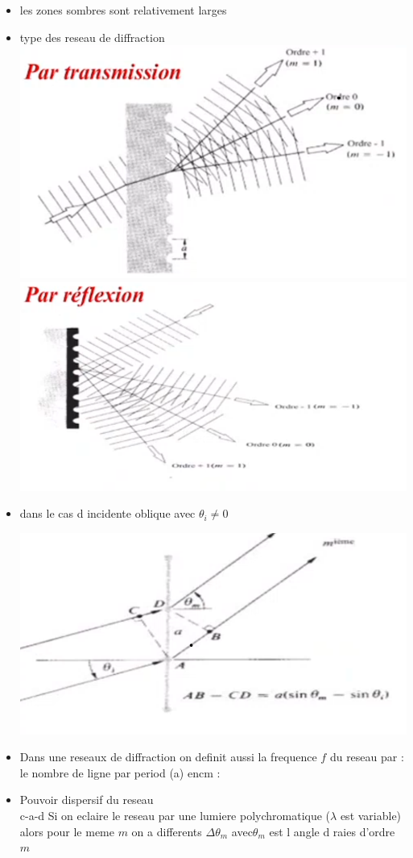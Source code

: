 \documentclass[12pt]{book}
\begin{document}
\begin{itemize}
                \item les zones sombres sont relativement larges 
                \item type des reseau de diffraction \\
                    \includegraphics[width=0.49\linewidth]{pic/reseaudediffractionpartransmission.png}
                    \includegraphics[width=0.49\linewidth]{pic/reseaudediffractionparreflexion.png}
                \item \begin{minipage}{0.49\linewidth}
                    dans le cas d incidente oblique  avec $\theta_i \not = 0$
                \end{minipage}
                \begin{minipage}{0.49\linewidth}
                    \includegraphics[width=0.49\linewidth ]{pic/reseaudediffractionoblique.png}
                \end{minipage}
                \item Dans une reseaux de diffraction on definit aussi la frequence $f$ du reseau par : le nombre de ligne par period (a) encm  :  
                \item Pouvoir dispersif du reseau  \\ c-a-d Si on eclaire le reseau par une lumiere polychromatique ($\lambda $ est variable) alors pour le meme $m$ on a differents $\Delta\theta_m$ avec$\theta_m$ est l angle d raies d'ordre $m$ 
            \end{itemize}
\end{document}
